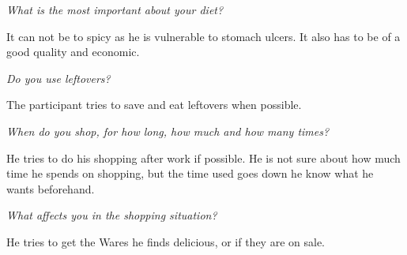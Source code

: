 \emph{What is the most important about your diet?}

It can not be to spicy as he is vulnerable to stomach ulcers. It also has to be of a good quality and economic.

\emph{Do you use leftovers?}

The participant tries to save and eat leftovers when possible.

\emph{When do you shop, for how long, how much and how many times?}

He tries to do his shopping after work if possible. He is not sure about how much time he spends on shopping, but the time used goes down he know what he wants beforehand.

\emph{What affects you in the shopping situation?}

He tries to get the Wares he finds delicious, or if they are on sale.